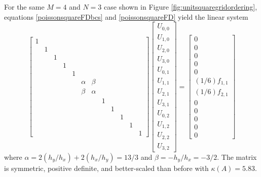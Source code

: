 \medskip\noindent\hrulefill
\begin{example} For the same $M=4$ and $N=3$ case shown in Figure \ref{fig:unitsquaregridordering}, equations \eqref{poissonsquareFDbcs} and \eqref{poissonsquareFD} yield the linear system
\begin{equation*}
\begin{bmatrix}
1 &  &  &  &  &  &  &  &  &  &  &  \\
  & 1&  &  &  &  &  &  &  &  &  &  \\
  &  & 1&  &  &  &  &  &  &  &  &  \\
  &  &  & 1&  &  &  &  &  &  &  &  \\
  &  &  &  & 1&  &  &  &  &  &  &  \\
  &  &  &  &  & \alpha& \beta&  &  &  &  &  \\
  &  &  &  &  & \beta& \alpha&  &  &  &  &  \\
  &  &  &  &  &  &  & 1&  &  &  &  \\
  &  &  &  &  &  &  &  & 1&  &  &  \\
  &  &  &  &  &  &  &  &  & 1&  &  \\
  &  &  &  &  &  &  &  &  &  & 1&  \\
  &  &  &  &  &  &  &  &  &  &  & 1
\end{bmatrix}
\begin{bmatrix}
U_{0,0} \\
U_{1,0} \\
U_{2,0} \\
U_{3,0} \\
U_{0,1} \\
U_{1,1} \\
U_{2,1} \\
U_{3,1} \\
U_{0,2} \\
U_{1,2} \\
U_{2,2} \\
U_{3,2}
\end{bmatrix}
=
\begin{bmatrix}
0 \\
0 \\
0 \\
0 \\
0 \\
(1/6) f_{1,1} \\
(1/6) f_{2,1} \\
0 \\
0 \\
0 \\
0 \\
0
\end{bmatrix}
\end{equation*}
where $\alpha = 2 (h_y/h_x) + 2 (h_x/h_y) = 13/3$ and $\beta = - h_y/h_x = - 3/2$.  The matrix is symmetric, positive definite, and better-scaled than before with $\kappa(A)=5.83$.
\end{example}
\noindent\hrulefill

